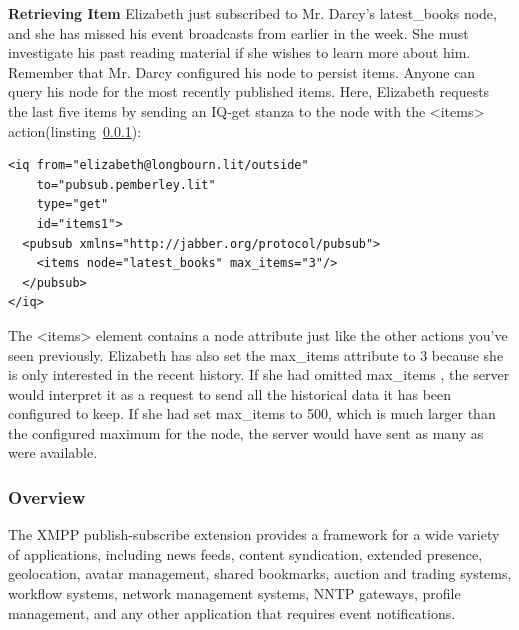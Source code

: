 \textbf{Retrieving Item}
Elizabeth just subscribed to Mr. Darcy's latest\_books node, and she has missed his event broadcasts from earlier in the week. She must investigate his past reading material if she wishes to learn more about him. Remember that Mr. Darcy configured his node to persist items. Anyone can query his node for the most recently published items. Here, Elizabeth requests the last five items by sending an IQ-get stanza to the node with the <items> action(linsting~\ref{}):
\begin{lstlisting}[label=node_creation,caption=PubSub Node Creation]
<iq from="elizabeth@longbourn.lit/outside"
    to="pubsub.pemberley.lit"
    type="get"
    id="items1">
  <pubsub xmlns="http://jabber.org/protocol/pubsub">
    <items node="latest_books" max_items="3"/>
  </pubsub>
</iq>
		\end{lstlisting}
The <items> element contains a node attribute just like the other actions you’ve seen previously. Elizabeth has also set the max\_items attribute to 3 because she is only interested in the recent history. If she had omitted max\_items , the server would interpret it as a request to send all the historical data it has been configured to keep. If she had set max\_items to 500, which is much larger than the configured maximum for the node, the server would have sent as many as were available.


\subsubsection{Overview}
The XMPP publish-subscribe extension provides a framework for a wide variety of applications, including news feeds, content syndication, extended presence, geolocation, avatar management, shared bookmarks, auction and trading systems, workflow systems, network management systems, NNTP gateways, profile management, and any other application that requires event notifications.

